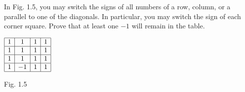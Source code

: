 In Fig. 1.5, you may switch the signs of all numbers of a row, column, or a parallel to one of the diagonals. In particular, you may switch the sign of each corner square. Prove that at least one $-1$ will remain in the table.
\begin{center}
$\begin{array}{|c|c|c|c|}\hline 1 & 1 & 1 & 1\\\hline 1 & 1 & 1 & 1\\\hline 1 & 1 & 1 & 1\\\hline 1 & -1 & 1 & 1\\\hline\end{array}$

Fig. 1.5
\end{center}
